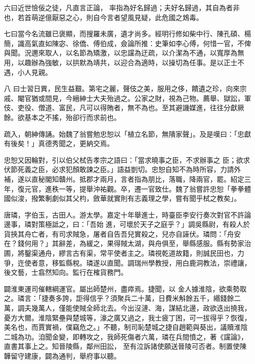 \begin{pinyinscope}
 六曰近世憸佞之徒，凡直言正論，
 率指為好名歸過；夫好名歸過，其自為者非也，若首萌逆億厭惡之心，則自今言者望風見疑，此危國之鴆毒。



 七曰當今名流雖已褒顯，而搜羅未廣，遺才尚多。經明行修如柴中行、陳孔碩、楊簡，識高氣直如陳宓、徐僑、傅伯成，僉論所推：史筆如李心傅，何惜一官，不俾與聞。況邇來取人，以名節為矯激，以忠讜為迂疏，以介潔為不通，以寬厚為無用，以趣辦為強敏，以拱默為靖共，以迎合為適時，以操切為任事。是以正士不遇，小人見親。



 八
 曰士習日異，民生益艱。第宅之麗，聲伎之美，服用之侈，饋遺之珍，向來宗戚、閹官猶或間見，今縉紳士大夫殆過之。公家之財，視為己物。薦舉、獄訟，軍伎、吏役、僧道、富民，凡可以得賄者，無不為也。至其避譏媒進，往往分獻厥餘。欲基本之不搖，殆卻行而求前也。



 疏入，朝紳傳誦。始魏了翁嘗勉忠恕以「植立名節，無隤家聲」。及是嘆曰：「忠獻有後矣！」真德秀聞之，更納交焉。



 忠恕又因輪對，引以伯父栻告孝宗之語曰：「當求曉事之臣，不求辦事之
 臣；欲求伏節死義之臣，必求犯顏敢諫之臣。」語益剴切。忠恕自知不為時所容，力請外補，遂以直秘閣知贛州。抵郡才兩月，言者指為朋比，落職，降兩官，罷。紹定三年，復元官，進秩一等，提舉沖祐觀。卒，遷一官致仕。魏了翁嘗許忠恕「拳拳體國似浚，撥繁剸劇似其父枃，斂華就實則有志義理之學，嘗有聞乎栻之教矣」。



 唐璘，字伯玉，古田人。游太學。嘉定十年舉進士，時臺臣李安行奏次對官不許論邊事，璘對策極詆之，曰：「吾始
 進，可壞於天子之庭乎？」調吳縣尉，有殺人於貨挾其舟亡者，有司求賊急，屠者自告吾兒實殺之，兒亦自誣伏。璘問：「舟安在？錢何用？」其辭差，為緩之，果得賊太湖，與舟俱至，舉縣感服。縣有勢家治圃，將鑿渠通舟，繆言古有渠，常平使者主之。璘視乾道故籍，則誠民田也，力爭，迕使者意，移監縣稅。璘遂以直聞。調瑞州學教授，用白鹿洞教法，崇禮讓，後文藝，士翕然知向。監行在榷貨務門。



 闢淮東運司催轄綱運官。屬出師楚州，盡瘁焉。捷聞，以
 金人據淮陰，欲乘勢取之。璘言：「捷奏多誇，詎得信乎？須聚兵二十萬，日費米斛餘五千，緡錢餘二萬，調夫幾萬人，僅能使賊全師北去。今出沒漣、海，謀結北邊，政欲迭出撓我，憂方大爾。淮陰緊壘與楚城等，濠之廣又過之，我士疲丁困，可一拔得乎？恢復，美名也，而賈實禍，僕竊危之。」不聽，制司恥楚城之捷自趙範與葵出，議贖淮陰二城為功。洎聞金變，即轉攻之，我師死傷者六萬，璘在兵間憤之，著《讜論》，直書其事上之。知晉陵縣，鄰州田訟，
 至有泣訴諸使願送晉陵可否者。制置使陳韡留守建康，闢為通判，舉府事以聽。




\end{pinyinscope}
